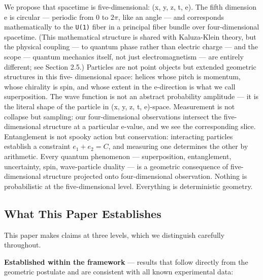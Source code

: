 \documentclass[aps,prd,preprint,superscriptaddress,longbibliography,floatfix]{revtex4-2}
\theoremstyle{remark}
\begin{document}
We propose that spacetime is five-dimensional: (x, y, z, t, e). The fifth dimension e is circular --- periodic from 0 to $2\pi$, like an angle --- and corresponds mathematically to the \texttt{U(1)} fiber in a principal fiber bundle over four-dimensional spacetime. (This mathematical structure is shared with Kaluza-Klein theory, but the physical coupling --- to quantum phase rather than electric charge --- and the scope --- quantum mechanics itself, not just electromagnetism --- are entirely different; see Section 2.5.) Particles are not point objects but extended geometric structures in this five- dimensional space: helices whose pitch is momentum, whose chirality is spin, and whose extent in the e-direction is what we call superposition. The wave function is not an abstract probability amplitude --- it is the literal shape of the particle in (x, y, z, t, e)-space. Measurement is not collapse but sampling: our four-dimensional observations intersect the five-dimensional structure at a particular e-value, and we see the corresponding slice. Entanglement is not spooky action but conservation: interacting particles establish a constraint $e_{1} + e_{2} = C$, and measuring one determines the other by arithmetic. Every quantum phenomenon --- superposition, entanglement, uncertainty, spin, wave-particle duality --- is a geometric consequence of five-dimensional structure projected onto four-dimensional observation. Nothing is probabilistic at the five-dimensional level. Everything is deterministic geometry.



\subsection{What This Paper Establishes}

This paper makes claims at three levels, which we distinguish carefully throughout.

\textbf{Established within the framework} --- results that follow directly from the geometric postulate and are consistent with all known experimental data:
\end{document}
